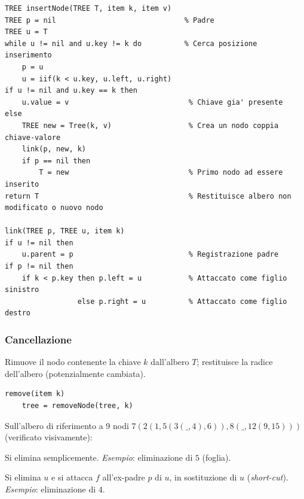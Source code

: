\documentclass[12pt, a4paper]{article}
\begin{document}
\begin{verbatim}
TREE insertNode(TREE T, item k, item v)
TREE p = nil                              % Padre
TREE u = T
while u != nil and u.key != k do          % Cerca posizione inserimento
    p = u
    u = iif(k < u.key, u.left, u.right)
if u != nil and u.key == k then
    u.value = v                            % Chiave gia' presente
else
    TREE new = Tree(k, v)                  % Crea un nodo coppia chiave-valore
    link(p, new, k)
    if p == nil then
        T = new                            % Primo nodo ad essere inserito
return T                                   % Restituisce albero non modificato o nuovo nodo

link(TREE p, TREE u, item k)
if u != nil then
    u.parent = p                           % Registrazione padre
if p != nil then
    if k < p.key then p.left = u           % Attaccato come figlio sinistro
                 else p.right = u          % Attaccato come figlio destro
\end{verbatim}

\subsubsection{Cancellazione}

\begin{tcolorbox}[colback=lightergray!5, colframe=tocsubsec, title=\textbf{\texttt{removeNode()}}]
Rimuove il nodo contenente la chiave $k$ dall'albero $T$; restituisce la radice dell'albero (potenzialmente cambiata).
\end{tcolorbox}

\begin{verbatim}
remove(item k)
    tree = removeNode(tree, k)
\end{verbatim}

Sull'albero di riferimento a 9 nodi $7(2(1,5(3(\_,4),6)),8(\_,12(9,15)))$ (verificato visivamente):

\begin{tcolorbox}[colback=lightergray!5, colframe=tocsubsec, title=\textbf{Caso 1: $u$ Senza Figli}]
Si elimina semplicemente. \textit{Esempio}: eliminazione di $5$ (foglia).
\end{tcolorbox}

\begin{tcolorbox}[colback=lightergray!5, colframe=tocsubsec, title=\textbf{Caso 2: $u$ ha un Solo Figlio $f$}]
Si elimina $u$ e si attacca $f$ all'ex-padre $p$ di $u$, in sostituzione di $u$ (\textit{short-cut}). \textit{Esempio}: eliminazione di $4$.
\end{tcolorbox}
\end{document}
